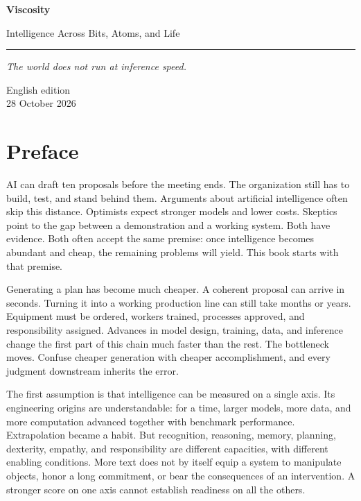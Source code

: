 \documentclass[11pt,openany]{book}
\begin{document}
\begin{titlepage}
\centering
\vspace*{32mm}
{\fontsize{42}{46}\selectfont\bfseries Viscosity\par}
\vspace{9mm}
{\Large Intelligence Across Bits, Atoms, and Life\par}
\vspace{14mm}
{\color{rust}\rule{50mm}{0.8pt}\par}
\vspace{13mm}
{\large\itshape The world does not run at inference speed.\par}
\vfill
{\small English edition\\28 October 2026\par}
\vspace*{13mm}
\end{titlepage}
\frontmatter
\chapter*{Preface}

AI can draft ten proposals before the meeting ends. The organization still has to build, test, and stand behind them. Arguments about artificial intelligence often skip this distance. Optimists expect stronger models and lower costs. Skeptics point to the gap between a demonstration and a working system. Both have evidence. Both often accept the same premise: once intelligence becomes abundant and cheap, the remaining problems will yield. This book starts with that premise.

Generating a plan has become much cheaper. A coherent proposal can arrive in seconds. Turning it into a working production line can still take months or years. Equipment must be ordered, workers trained, processes approved, and responsibility assigned. Advances in model design, training, data, and inference change the first part of this chain much faster than the rest. The bottleneck moves. Confuse cheaper generation with cheaper accomplishment, and every judgment downstream inherits the error.

The first assumption is that intelligence can be measured on a single axis. Its engineering origins are understandable: for a time, larger models, more data, and more computation advanced together with benchmark performance. Extrapolation became a habit. But recognition, reasoning, memory, planning, dexterity, empathy, and responsibility are different capacities, with different enabling conditions. More text does not by itself equip a system to manipulate objects, honor a long commitment, or bear the consequences of an intervention. A stronger score on one axis cannot establish readiness on all the others.
\end{document}
